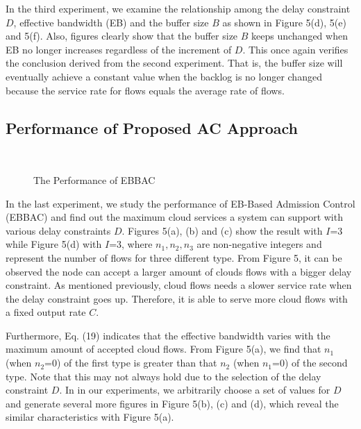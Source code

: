 \documentclass[a4paper]{article}
\begin{document}
In the third experiment, we examine the relationship among the delay constraint $D$, effective bandwidth (EB) and the buffer size $B$ as shown in Figure 5(d), 5(e) and 5(f). Also, figures clearly show that the buffer size $B$ keeps unchanged when EB no longer increases regardless of the increment of $D$. This once again verifies the conclusion derived from the second experiment. That is, the buffer size will eventually achieve a constant value when the backlog is no longer changed because the service rate for flows equals the average rate of flows.

\subsection{Performance of Proposed AC Approach}

\begin{figure}[h]
  \centering
  \\
  \caption{The Performance of EBBAC}
  \label{fig5}
\end{figure}

In the last experiment, we study the performance of EB-Based Admission Control (EBBAC) and find out the maximum cloud services a system can support with various delay constraints $D$. Figures 5(a), (b) and (c) show the result with $I$=3 while Figure 5(d) with $I$=3, where $n_1,n_2,n_3$ are non-negative integers and represent the number of flows for three different type. From Figure 5, it can be observed the node can accept a larger amount of clouds flows with a bigger delay constraint. As mentioned previously, cloud flows needs a slower service rate when the delay constraint goes up. Therefore, it is able to serve more cloud flows with a fixed output rate $C$.

Furthermore, Eq. (19) indicates that the effective bandwidth varies with the maximum amount of accepted cloud flows. From Figure 5(a), we find that $n_1$ (when $n_2$=0) of the first type is greater than that $n_2$ (when $n_1$=0) of the second type. Note that this may not always hold due to the selection of the delay constraint $D$. In in our experiments, we arbitrarily choose a set of values for $D$ and generate several more figures in Figure 5(b), (c) and (d), which reveal the similar characteristics with Figure 5(a).
\end{document}
